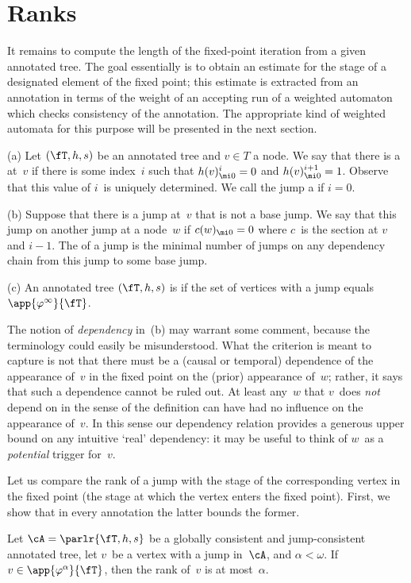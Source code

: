 \documentclass{LMCS}
\begin{document}
\section{Ranks}
\label{sect:ranks}

It remains to compute the length of the fixed-point iteration from
a given annotated tree.
The goal essentially is to obtain an estimate for the stage of a designated
element of the fixed point\?; this estimate is extracted from an annotation
in terms of the weight of an accepting run of a weighted
automaton which checks consistency of the annotation.
The appropriate kind of weighted automata for this purpose will be
presented in the next section.

\begin{defi}
\textup{(a)}
Let $(\fT,h,s)$ be an annotated tree and $v \in T$ a node.
We say that there is a  at~$v$
if there is some index~$i$ such that
$h(v)^i_{\mi0} = 0$ and $h(v)^{i+1}_{\mi0} = 1$.
Observe that this value of $i$~is uniquely determined.
We call the jump a  if $i=0$.

\textup{(b)}
Suppose that there is a jump at~$v$ that is not a base jump.
We say that this jump  on another jump at a node~$w$
if $c(w)_{\mi0}=0$ where $c$~is the section at $v$ and $i-1$.
The  of a jump is the minimal number of jumps
on any dependency chain from this jump to some base jump.

\textup{(c)}
An annotated tree $(\fT,h,s)$ is 
if the set of vertices with a jump equals $\app{\varphi^{\infty}}{\fT}$.
\end{defi}

The notion of \emph{dependency} in~(b) may warrant some comment, because
the terminology could easily be misunderstood. What the criterion is meant to
capture is not that there must be a (causal or temporal) dependence of the
appearance of~$v$ in the fixed point on the (prior) appearance of~$w$\?;
rather, it says that such a dependence cannot be ruled out.
At least any~$w$ that $v$~does \emph{not} depend on in the sense of the definition can
have had no influence on the appearance of~$v$.
In this sense our dependency relation provides a generous upper bound
on any intuitive `real' dependency\?:
it may be useful to think of $w$~as a \emph{potential} trigger for~$v$.

Let us compare the rank of a jump with the stage of the corresponding vertex
in the fixed point (the stage at which the vertex enters the fixed point).
First, we show that in every annotation the latter bounds the former.
\begin{lem}\label{lem:stage bounds min rank}
Let $\cA=\parlr{\fT,h,s}$
be a globally consistent and jump-consistent annotated tree,
let $v$~be a vertex with a jump in~$\cA$, and $\alpha < \omega$.
If $v\in\app{\varphi^{\alpha}}{\fT}$,
then the rank of~$v$ is at most~$\alpha$.
\end{lem}
\end{document}
